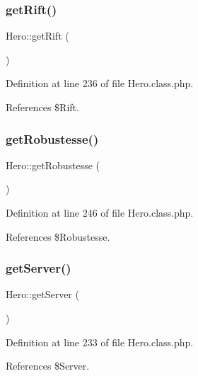 \subsubsection{\texorpdfstring{get\+Rift()}{getRift()}}
{\footnotesize\ttfamily Hero\+::get\+Rift (\begin{DoxyParamCaption}{ }\end{DoxyParamCaption})}



Definition at line 236 of file Hero.\+class.\+php.



References \$\+Rift.

\mbox{\label{class_hero_ac31ad2df259f5decaaa4cb7a8b4b22ad}} 
\subsubsection{\texorpdfstring{get\+Robustesse()}{getRobustesse()}}
{\footnotesize\ttfamily Hero\+::get\+Robustesse (\begin{DoxyParamCaption}{ }\end{DoxyParamCaption})}



Definition at line 246 of file Hero.\+class.\+php.



References \$\+Robustesse.

\mbox{\label{class_hero_a534e160f3dabc7b45087b3ebf353acd5}} 
\subsubsection{\texorpdfstring{get\+Server()}{getServer()}}
{\footnotesize\ttfamily Hero\+::get\+Server (\begin{DoxyParamCaption}{ }\end{DoxyParamCaption})}



Definition at line 233 of file Hero.\+class.\+php.



References \$\+Server.

\mbox{\label{class_hero_a183b471423aa1b3f59032e25683fd834}} 
